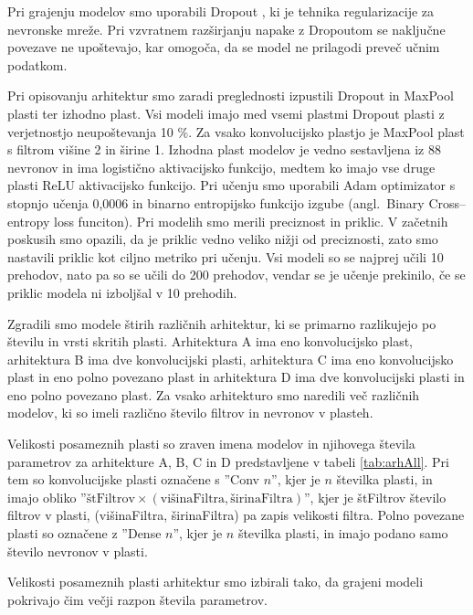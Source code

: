 \documentclass[a4paper, 12pt, openright]{book}
\newcommand{\en}{angl.}
\begin{document}
Pri grajenju modelov smo uporabili Dropout \cite{nitish2014dropout}, ki je tehnika regularizacije za nevronske mreže.
Pri vzvratnem razširjanju napake z Dropoutom se naključne povezave ne upoštevajo, kar omogoča, da se model ne prilagodi preveč učnim podatkom.

Pri opisovanju arhitektur smo zaradi preglednosti izpustili Dropout in MaxPool plasti ter izhodno plast.
Vsi modeli imajo med vsemi plastmi Dropout plasti z verjetnostjo neupoštevanja 10 \%.
Za vsako konvolucijsko plastjo je MaxPool plast s filtrom višine 2 in širine 1.
Izhodna plast modelov je vedno sestavljena iz 88 nevronov in ima logistično aktivacijsko funkcijo, medtem ko imajo vse druge plasti ReLU aktivacijsko funkcijo.
Pri učenju smo uporabili Adam optimizator \cite{kingma2017adam} s stopnjo učenja 0,0006 in binarno entropijsko funkcijo izgube (\en\ Binary Cross--entropy loss funciton).
Pri modelih smo merili preciznost in priklic.
V začetnih poskusih smo opazili, da je priklic vedno veliko nižji od preciznosti, zato smo nastavili priklic kot ciljno metriko pri učenju.
Vsi modeli so se najprej učili 10 prehodov, nato pa so se učili do 200 prehodov, vendar se je učenje prekinilo, če se priklic modela ni izboljšal v 10 prehodih.

Zgradili smo modele štirih različnih arhitektur, ki se primarno razlikujejo po številu in vrsti skritih plasti.
Arhitektura A ima eno konvolucijsko plast, arhitektura B ima dve konvolucijski plasti, arhitektura C ima eno konvolucijsko plast in eno polno povezano plast in arhitektura D ima dve konvolucijski plasti in eno polno povezano plast.
Za vsako arhitekturo smo naredili več različnih modelov, ki so imeli različno število filtrov in nevronov v plasteh.

Velikosti posameznih plasti so zraven imena modelov in njihovega števila parametrov za arhitekture A, B, C in D predstavljene v tabeli \ref{tab:arhAll}.
Pri tem so konvolucijske plasti označene s ''Conv $ n $'', kjer je $ n $ številka plasti, in imajo obliko ''$ \text{štFiltrov} \times (\text{višinaFiltra}, \text{širinaFiltra}) $'', kjer je štFiltrov število filtrov v plasti, (višinaFiltra, širinaFiltra) pa zapis velikosti filtra.
Polno povezane plasti so označene z ''Dense $ n $'', kjer je $ n $ številka plasti, in imajo podano samo število nevronov v plasti.

Velikosti posameznih plasti arhitektur smo izbirali tako, da grajeni modeli pokrivajo čim večji razpon števila parametrov.
\end{document}
